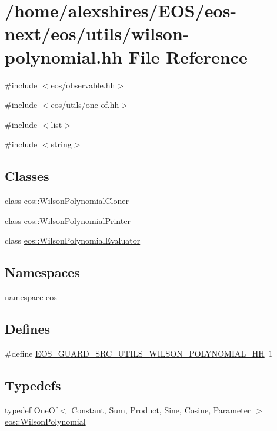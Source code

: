 \hypertarget{wilson-polynomial_8hh}{
\section{/home/alexshires/EOS/eos-\/next/eos/utils/wilson-\/polynomial.hh File Reference}
\label{wilson-polynomial_8hh}
}
{\ttfamily \#include $<$eos/observable.hh$>$}\par
{\ttfamily \#include $<$eos/utils/one-\/of.hh$>$}\par
{\ttfamily \#include $<$list$>$}\par
{\ttfamily \#include $<$string$>$}\par
\subsection*{Classes}
\begin{DoxyCompactItemize}
\item 
class \hyperlink{classeos_1_1WilsonPolynomialCloner}{eos::WilsonPolynomialCloner}
\item 
class \hyperlink{classeos_1_1WilsonPolynomialPrinter}{eos::WilsonPolynomialPrinter}
\item 
class \hyperlink{classeos_1_1WilsonPolynomialEvaluator}{eos::WilsonPolynomialEvaluator}
\end{DoxyCompactItemize}
\subsection*{Namespaces}
\begin{DoxyCompactItemize}
\item 
namespace \hyperlink{namespaceeos}{eos}
\end{DoxyCompactItemize}
\subsection*{Defines}
\begin{DoxyCompactItemize}
\item 
\#define \hyperlink{wilson-polynomial_8hh_ae33bd5eb549806a3ba3d61f54994bfba}{EOS\_\-GUARD\_\-SRC\_\-UTILS\_\-WILSON\_\-POLYNOMIAL\_\-HH}~1
\end{DoxyCompactItemize}
\subsection*{Typedefs}
\begin{DoxyCompactItemize}
\item 
typedef OneOf$<$ Constant, Sum, Product, Sine, Cosine, Parameter $>$ \hyperlink{namespaceeos_ad0c57fa62d09f6465421603cb5285284}{eos::WilsonPolynomial}
\end{DoxyCompactItemize}
